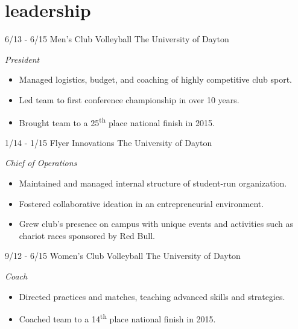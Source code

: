 \documentclass[print]{friggeri-cv}
\begin{document}
\begin{entrylist}
\end{entrylist}

\section{leadership}
\begin{entrylist}

\entry
{6/13 - 6/15}
{Men's Club Volleyball}
{The University of Dayton}
{
\emph{President}
\begin{itemize}
	\item Managed logistics, budget, and coaching of highly competitive club sport.
	\item Led team to first conference championship in over 10 years. 
	\item Brought team to a 25\textsuperscript{th} place national finish in 2015.
\end{itemize}
}

\entry
{1/14 - 1/15}
{Flyer Innovations}
{The University of Dayton}
{
\emph{Chief of Operations} 
\begin{itemize}
	\item Maintained and managed internal structure of student-run organization. 
	\item Fostered collaborative ideation in an entrepreneurial environment. 
	\item Grew club's presence on campus with unique events and activities such as chariot races sponsored by Red Bull.
\end{itemize}
}

\entry
{9/12 - 6/15}
{Women's Club Volleyball}
{The University of Dayton}
{
\emph{Coach}
\begin{itemize}
	\item Directed practices and matches, teaching advanced skills and strategies.
	\item Coached team to a 14\textsuperscript{th} place national finish in 2015.
\end{itemize}
}

\end{entrylist}

\end{document}
